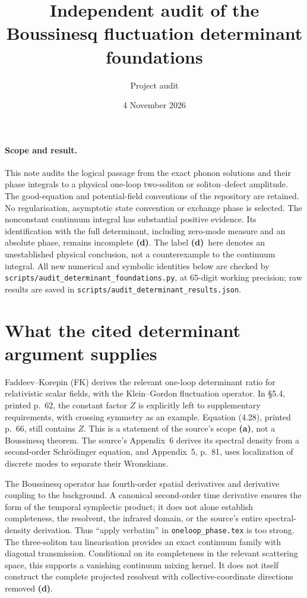\documentclass[11pt]{article}
\title{Independent audit of the Boussinesq fluctuation determinant foundations}
\author{Project audit}
\date{4 November 2026}
\newcommand{\Ld}{\textbf{(d)}}
\begin{document}
\maketitle

\paragraph{Scope and result.}
This note audits the logical passage from the exact phonon solutions and their
phase integrals to a physical one-loop two-soliton or soliton--defect amplitude.
The good-equation and potential-field conventions of the repository are retained.
No regularisation, asymptotic state convention or exchange phase is selected.
The nonconstant continuum integral has substantial positive evidence. Its
identification with the full determinant, including zero-mode measure and an
absolute phase, remains incomplete \Ld. The label \Ld\ here denotes an
unestablished physical conclusion, not a counterexample to the continuum
integral. All new numerical and symbolic identities below are checked by
\texttt{scripts/audit\_\allowbreak determinant\_\allowbreak foundations.py}, at 65-digit working precision;
raw results are saved in \texttt{scripts/audit\_determinant\_results.json}.

\section{What the cited determinant argument supplies}

Faddeev--Korepin (FK) \cite{FK} derives the relevant one-loop determinant ratio
for relativistic scalar fields, with the Klein--Gordon fluctuation operator.
In \S5.4, printed p.~62, the constant factor $Z$ is explicitly left to
supplementary requirements, with crossing symmetry as an example. Equation
(4.28), printed p.~66, still contains $Z$. This is a statement of the source's
scope \textbf{(a)}, not a Boussinesq theorem. The source's Appendix~6 derives its
spectral density from a second-order Schr\"odinger equation, and Appendix~5,
p.~81, uses localization of discrete modes to separate their Wronskians.

The Boussinesq operator has fourth-order spatial derivatives and derivative
coupling to the background. A canonical second-order time derivative ensures
the form of the temporal symplectic product; it does not alone establish
completeness, the resolvent, the infrared domain, or the source's entire
spectral-density derivation. Thus ``apply verbatim'' in
\texttt{oneloop\_phase.tex} is too strong. The three-soliton tau linearisation
provides an exact continuum family with diagonal transmission. Conditional on
its completeness in the relevant scattering space, this supports a vanishing
continuum mixing kernel. It does not itself construct the complete projected
resolvent with collective-coordinate directions removed \Ld.
\end{document}

